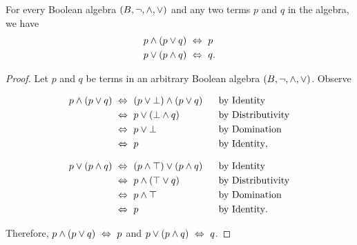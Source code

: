 \begin{theorem}[Absorption]
    For every Boolean algebra \((B, \neg, \wedge, \vee)\) and any two terms \(p\) and \(q\) in the algebra,
    we have
    \begin{align*}
        p \wedge (p \vee q) &~\Leftrightarrow~ p\\
        p \vee (p \wedge q) &~\Leftrightarrow~ q.
    \end{align*}
\end{theorem}
\begin{proof}
    Let \(p\) and \(q\) be terms in an arbitrary Boolean algebra \((B, \neg, \wedge, \vee)\).
    Observe

    \begin{minipage}{.45\linewidth}
        \vspace{-\parskip-\abovedisplayskip}
        \begin{alignat*}{2}
            p \wedge (p \vee q) &~\Leftrightarrow~ (p \vee \bot) \wedge (p \vee q)~~&&\text{by Identity}\\
                                &~\Leftrightarrow~ p \vee (\bot \wedge q) &&\text{by Distributivity}\\
                                &~\Leftrightarrow~ p \vee \bot &&\text{by Domination}\\
                                &~\Leftrightarrow~ p &&\text{by Identity},
        \end{alignat*}
    \end{minipage}%
    \hfill\vline\hfill
    \begin{minipage}{.45\linewidth}
        \vspace{-\parskip-\abovedisplayskip}
        \begin{alignat*}{2}
            p \vee (p \wedge q) &~\Leftrightarrow~ (p \wedge \top) \vee (p \wedge q)~~&&\text{by Identity}\\
                                &~\Leftrightarrow~ p \wedge (\top \vee q) &&\text{by Distributivity}\\
                                &~\Leftrightarrow~ p \wedge \top &&\text{by Domination}\\
                                &~\Leftrightarrow~ p &&\text{by Identity}.
        \end{alignat*}
    \end{minipage}

    Therefore, \(p \wedge (p \vee q) ~\Leftrightarrow~ p\) and \(p \vee (p \wedge q) ~\Leftrightarrow~ q\).
\end{proof}

